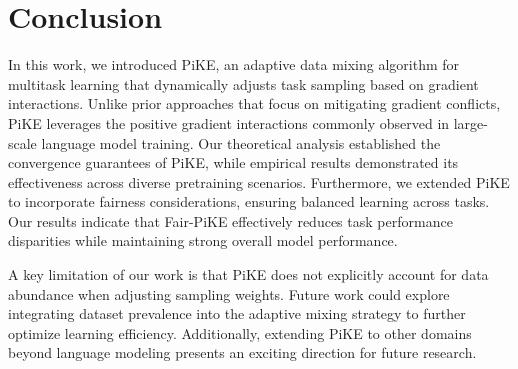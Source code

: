 \section{Conclusion}
In this work, we introduced PiKE, an adaptive data mixing algorithm for multitask learning that dynamically adjusts task sampling based on gradient interactions. Unlike prior approaches that focus on mitigating gradient conflicts, PiKE leverages the positive gradient interactions commonly observed in large-scale language model training. Our theoretical analysis established the convergence guarantees of PiKE, while empirical results demonstrated its effectiveness across diverse pretraining scenarios. Furthermore, we extended PiKE to incorporate fairness considerations, ensuring balanced learning across tasks. Our results indicate that Fair-PiKE effectively reduces task performance disparities while maintaining strong overall model performance.

A key limitation of our work is that PiKE does not explicitly account for data abundance when adjusting sampling weights. Future work could explore integrating dataset prevalence into the adaptive mixing strategy to further optimize learning efficiency. Additionally, extending PiKE to other domains beyond language modeling presents an exciting direction for future research.

%

%

%
